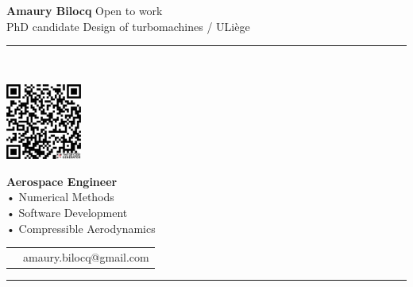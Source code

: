 \documentclass[11pt,a4paper]{memoir}
\begin{document}
\begin{Spacing}{0.75}%
\noindent
\textbf{Amaury Bilocq} \hfill \tiny{\color{gray}Open to work}\\ 
\noindent
\tiny PhD candidate \hfill {\color{gray}Design of turbomachines / ULiège}\\ 
\rule{74mm}{.3mm}\\

\begin{minipage}[t]{33mm}
    \vspace{0mm}
    \includegraphics[width=25mm]{cvABilocq.png} %
\end{minipage}
\hspace{-2mm}
\begin{minipage}[t]{42mm}
    \vspace{2mm}
    \begin{flushleft}
        
    {\scriptsize
        \begin{Spacing}{1}%
        \textbf{Aerospace Engineer}\\
        \hspace{0.5mm}• Numerical Methods\\
        \hspace{0.5mm}• Software Development\\
        \hspace{0.5mm}• Compressible Aerodynamics\vspace{2mm}\\
        \end{Spacing}
    }
    {\tiny
        \begin{tabular}{rl}
            \hspace{-6mm}{\color{gray}email} & amaury.bilocq@gmail.com\\
        \end{tabular}
        \vspace*{2mm}
    }
    \end{flushleft}
\end{minipage}

\rule{74mm}{0mm}
\end{Spacing}
\end{document}
